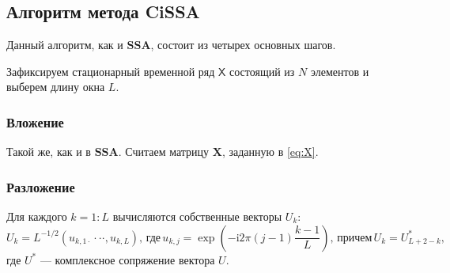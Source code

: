 \documentclass[a4paper, 11pt]{article}
\newcommand{\SSA}{\textbf{SSA}}
\newcommand{\TS}{\mathsf{X}}
\newtheorem{definition}{Определение} %
\begin{document}

\subsection{Алгоритм метода CiSSA}

Данный алгоритм, как и $\SSA$, состоит из четырех основных шагов.

Зафиксируем стационарный временной ряд $\TS$ состоящий из $N$ элементов и выберем длину окна $L$.
\subsubsection{Вложение}
Такой же, как и в $\SSA$. Считаем матрицу $\mathbf{X}$, заданную в \eqref{eq:X}.

\subsubsection{Разложение}

Для каждого $k = 1:L$ вычисляются собственные векторы ${U}_{k}$:
\begin{equation*}
	{U}_{k}=L^{-1/2}(u_{k,1\cdot}\cdot\cdot\cdot,u_{k,L}), \, \text{где} \, 
	u_{k,j}=\exp\left(-\mathrm{i}2\pi(j-1)\frac{k-1}{L}\right), \,
	\text{причем} \, U_{k} = U_{L+2-k}^*,
\end{equation*}
где $U^*$ --- комплексное сопряжение вектора $U$.
\end{document}
